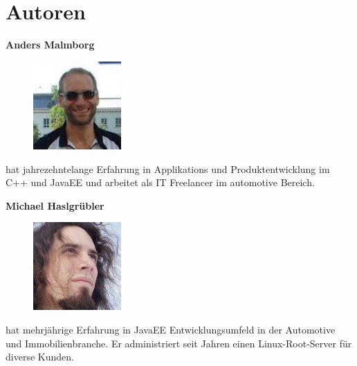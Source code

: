 \documentclass[12pt,a4paper,ngerman]{article}
\begin{document}
\section*{Autoren}

\newcommand{\authorboxheight}{5cm}
\begin{minipage}[t][\authorboxheight]{0.45\textwidth}
\textbf{Anders Malmborg}
\vskip0.3cm
\begin{figure}
\vspace{-20pt}
\includegraphics[width=0.3\textwidth]{images/anders.jpg}
\vspace{-20pt}
\end{figure}
hat jahrezehntelange Erfahrung in Applikations und Produktentwicklung im C++ und JavaEE  und arbeitet als IT Freelancer im automotive Bereich. 
\end{minipage}
\hspace{0.1\textwidth}
\begin{minipage}[t][\authorboxheight]{0.45\textwidth}
\textbf{Michael Haslgrübler}
\vskip0.3cm
\begin{figure}
\vspace{-20pt}
\includegraphics[width=0.3\textwidth]{images/michael.jpg}
\vspace{-20pt}
\end{figure}
hat mehrjährige Erfahrung in JavaEE Entwicklungsumfeld in der Automotive und Immobilienbranche. Er administriert seit Jahren einen Linux-Root-Server für diverse Kunden.
\end{minipage}



\end{document}
